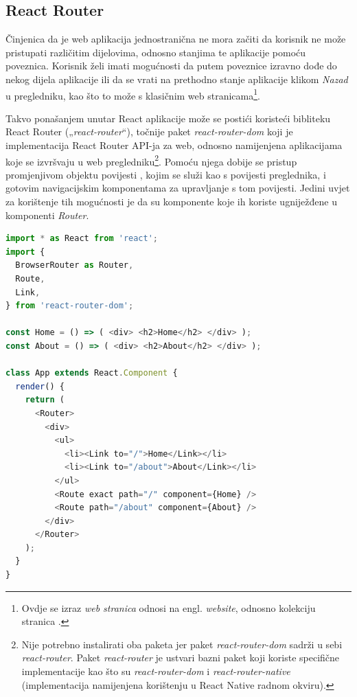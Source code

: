 \documentclass[times, utf8, diplomski, numeric]{fer}
\newcommand{\razmakp}{\vspace{18pt}}
\newcommand{\razmaks}{\vspace{10pt}}
\begin{document}
\razmaks
\subsection{React Router}

Činjenica da je web aplikacija jednostranična ne mora začiti da korisnik ne može pristupati različitim dijelovima, odnosno stanjima te aplikacije pomoću poveznica.
Korisnik želi imati mogućnosti da putem poveznice izravno dođe do nekog dijela aplikacije ili da se vrati na prethodno stanje aplikacije klikom \emph{Nazad} u pregledniku, kao što to može s klasičnim web stranicama\footnote{Ovdje se izraz \emph{web stranica} odnosi na engl. \emph{website}, odnosno kolekciju stranica .}.

Takvo ponašanjem unutar React aplikacije može se postići koristeći bibliteku React Router („\emph{react-router}“), točnije paket \emph{react-router-dom} koji je implementacija React Router API-ja za web, odnosno namijenjena aplikacijama koje se izvršvaju u web pregledniku\footnote{
    Nije potrebno instalirati oba paketa jer paket \emph{react-router-dom} sadrži u sebi \emph{react-router}.
    Paket \emph{react-router} je ustvari bazni paket koji koriste specifične implementacije kao što su \emph{react-router-dom} i \emph{react-router-native} (implementacija namijenjena korištenju u React Native radnom okviru).
}.
Pomoću njega dobije se pristup promjenjivom objektu povijesti , kojim se služi kao s povijesti preglednika, i gotovim navigacijskim komponentama za upravljanje s tom povijesti.
Jedini uvjet za korištenje tih mogućnosti je da su komponente koje ih koriste ugniježđene u komponenti \emph{Router}\citep{react_router}.

\razmakp %
\begin{lstlisting}[language=JavaScript, caption={Primjer korištenja React Router biblioteke}, label={lst:react_router}]
import * as React from 'react';
import {
  BrowserRouter as Router,
  Route,
  Link,
} from 'react-router-dom';

const Home = () => ( <div> <h2>Home</h2> </div> );
const About = () => ( <div> <h2>About</h2> </div> );

class App extends React.Component {
  render() {
    return (
      <Router>
        <div>
          <ul>
            <li><Link to="/">Home</Link></li>
            <li><Link to="/about">About</Link></li>
          </ul>
          <Route exact path="/" component={Home} />
          <Route path="/about" component={About} />
        </div>
      </Router>
    );
  }
}
\end{lstlisting}
\razmaks
\end{document}
